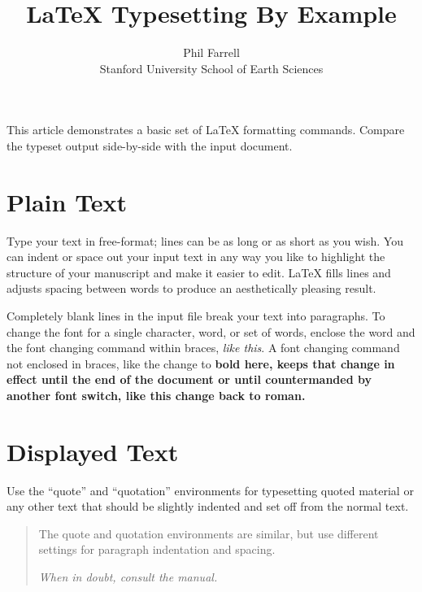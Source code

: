 \setlength{\topmargin}{-.5in}
\setlength{\textheight}{9in}
\setlength{\oddsidemargin}{.125in}
\setlength{\textwidth}{6.25in}

\title{LaTeX Typesetting By Example}
\author{Phil Farrell\\
Stanford University School of Earth Sciences}
\renewcommand{\today}{November 2, 1994}
\maketitle
This article demonstrates a basic set of LaTeX formatting commands.
Compare the typeset output side-by-side with the input document.

\section {Plain Text}
Type your text in free-format; lines can be as long
or as short
as you wish.
        You can indent         or space out
        your input 
            text in 
                any way you like to highlight the structure
        of your manuscript and make it easier to edit.
LaTeX fills lines and adjusts spacing between words to produce an
aesthetically pleasing result.

Completely blank lines in the input file break your text into
paragraphs.
To change the font for a single character, word, or set of words, 
enclose the word and the font changing command within braces, 
{\em like this}.
A font changing command not enclosed in braces, like the change to \bf 
bold here, keeps that change in effect until the end of the document or
until countermanded by another font switch, like this change back to 
\rm roman.

\section {Displayed Text}
Use the ``quote'' and  ``quotation'' environments for typesetting quoted
material or any other text that should be slightly indented and set off
from the normal text.
\begin{quotation}
The quote and quotation environments are similar, but use different 
settings for paragraph indentation and spacing.

\em When in doubt, consult the manual.
\end{quotation}

